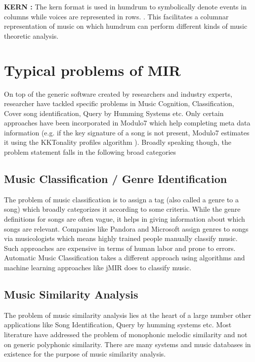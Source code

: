 \noindent \textbf{KERN :} The kern format is used in humdrum to symbolically denote events in columns while voices are represented in rows. \cite{humdrum}. This facilitates a columnar representation of music on which humdrum can perform  different kinds of music theoretic analysis. 

\section{Typical problems of MIR}

\noindent On top of the generic software created by researchers and industry experts, researcher have tackled specific problems in Music Cognition, Classification, Cover song identification, Query by Humming Systems etc. Only certain approaches have been incorporated in Modulo7 which help completing meta data information (e.g. if the key signature of a song is not present, Modulo7 estimates it using the KKTonality profiles algorithm \cite{kkTonalityKeyFinding}). Broadly speaking though, the problem statement falls in the following broad categories

\subsection{Music Classification / Genre Identification}

\noindent The problem of music classification is to assign a tag (also called a genre to a song) which broadly categorizes it according to some criteria. While the genre definitions for songs are often vague, it helps in giving information about which songs are relevant. Companies like Pandora and Microsoft assign genres to songs via musicologists \cite{genreclassification} which means highly trained people manually classify music. Such approaches are expensive in terms of human labor and prone to errors. Automatic Music Classification takes a different approach using algorithms and machine learning approaches like jMIR \cite{jMIR} does to classify music. 

\subsection{Music Similarity Analysis}

\noindent The problem of music similarity analysis lies at the heart of a large number other applications like Song Identification, Query by humming systems etc. Most literature have addressed the problem of monophonic melodic similarity \cite{simsurvey} and not on generic polyphonic similarity. There are many systems and music databases in existence for the purpose of music similarity analysis.

